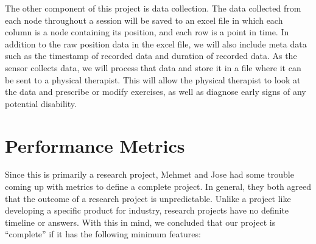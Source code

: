 \documentclass[onecolumn, draftclsnofoot,10pt, compsoc]{IEEEtran}
\begin{document}
The other component of this project is data collection. The data collected from each node throughout a session will be saved to an excel file in which each column is a node containing its position, and each row is a point in time. In addition to the raw position data in the excel file, we will also include meta data such as the timestamp of recorded data and duration of recorded data. As the sensor collects data, we will process that data and store it in a file where it can be sent to a physical therapist. This will allow the physical therapist to look at the data and prescribe or modify exercises, as well as diagnose early signs of any potential disability.

\section{Performance Metrics}
Since this is primarily a research project, Mehmet and Jose had some trouble coming up with metrics to define a complete project. In general, they both agreed that the outcome of a research project is unpredictable. Unlike a project like developing a specific product for industry, research projects have no definite timeline or answers. With this in mind, we concluded that our project is “complete” if it has the following minimum features:
\end{document}
